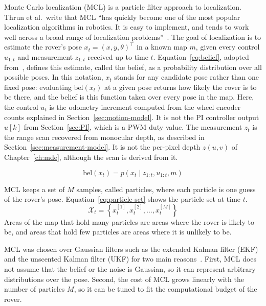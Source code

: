 Monte Carlo localization (MCL) is a particle filter approach to localization. Thrun et al.\ write
that MCL ``has quickly become one of the most popular localization algorithms in robotics. It is
easy to implement, and tends to work well across a broad range of localization
problems''~\cite{thrun2005probabilistic}\red{[page]}. The
goal of localization is to estimate the rover's pose $x_t = (x, y, \theta)^\top$ in a known
map $m$, given every control $u_{1:t}$ and measurement $z_{1:t}$ received up to time $t$.
Equation~\ref{eq:belief}, adopted from~\cite{thrun2005probabilistic}, defines this
estimate, called the belief, as a probability distribution over all possible poses.
In this notation, $x_t$ stands for any candidate pose rather than one fixed pose:
evaluating $\mathrm{bel}(x_t)$ at a given pose returns how likely the rover is to be
there, and the belief is this function taken over every pose in the map.
Here, the control $u_t$ is the odometry increment computed from the wheel encoder counts
explained in Section~\ref{sec:motion-model}. It is not the PI controller output $u[k]$ from
Section~\ref{sec:PI}, which is a PWM duty value. The measurement $z_t$ is the range scan
recovered from monocular depth, as described in Section~\ref{sec:measurement-model}. It is not the per-pixel
depth $z(u,v)$ of Chapter~\ref{ch:mde}, although the scan is derived from it.

\begin{equation}
  \label{eq:belief}
  \mathrm{bel}(x_t) = p(x_t \mid z_{1:t}, u_{1:t}, m)
\end{equation}

MCL keeps a set of $M$
samples, called particles, where each particle is one guess of the rover's pose.
Equation~\ref{eq:particle-set} shows the particle set at time $t$.
\begin{equation}
  \label{eq:particle-set}
  \mathcal{X}_t = \left\{ x_t^{[1]}, x_t^{[2]}, \dots, x_t^{[M]} \right\}
\end{equation}
Areas of the map that hold many particles are areas where the rover is likely to be, and
areas that hold few particles are areas where it is unlikely to be.

MCL was chosen over Gaussian filters such as the extended Kalman filter (EKF) and the
unscented Kalman filter (UKF) for two main reasons~\cite{thrun2005probabilistic}. First, MCL
does not assume that the belief or the noise is Gaussian, so it can represent arbitrary
distributions over the pose. Second, the cost of MCL grows linearly with the number of
particles $M$, so it can be tuned to fit the computational budget of the rover.

